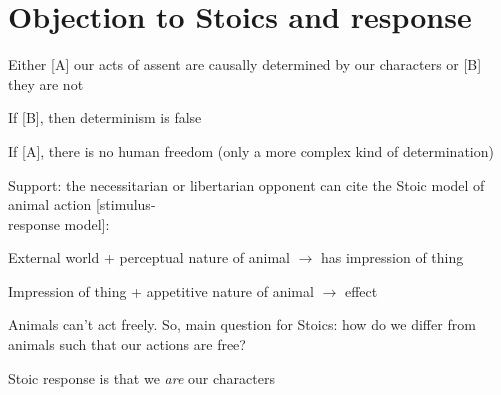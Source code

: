 \documentclass[11pt]{article}
\begin{document}
\section*{Objection to Stoics and response}

\noindent Either [A] our acts of assent are causally determined by our characters or [B] they are not
\vspace*{1mm}

\noindent If [B], then determinism is false
\vspace*{1mm}

\noindent If [A], there is no human freedom (only a more complex kind of determination)
\vspace*{1mm}

Support: the necessitarian or libertarian opponent can cite the Stoic model of animal action [stimulus-\\\hspace*{6mm}response model]:
\vspace*{1mm}

External world + perceptual nature of animal $\rightarrow$ has impression of thing
\vspace*{1mm}

Impression of thing + appetitive nature of animal $\rightarrow$ effect 
\vspace*{1mm}

\noindent Animals can't act freely. So, main question for Stoics: how do  we differ from animals such that our actions are free?
\vspace*{2mm}

\noindent Stoic response is that we \emph{are} our characters
\end{document}
